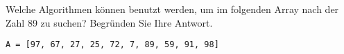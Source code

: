 %
%
Welche Algorithmen können benutzt werden, um im folgenden Array nach der Zahl \num{89} zu suchen? Begründen Sie Ihre Antwort.

\begin{center}
\lstinline[language=pseudocode]{A = [97, 67, 27, 25, 72, 7, 89, 59, 91, 98]}
\end{center}

\fillwithgrid{0.5in}

